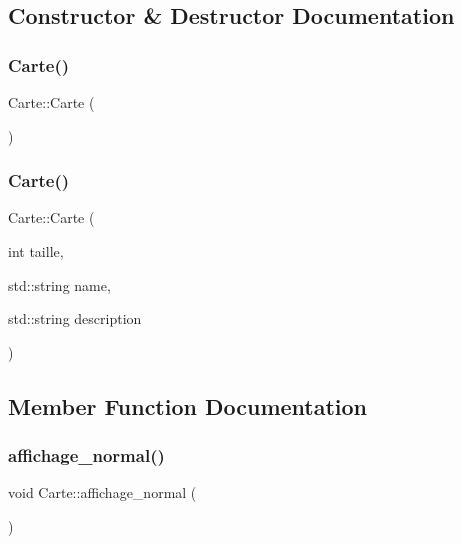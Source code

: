 \subsection{Constructor \& Destructor Documentation}
\mbox{\label{class_carte_a06daaca86c31c80f8308f4a81d46dc9b}} 
\subsubsection{\texorpdfstring{Carte()}{Carte()}\hspace{0.1cm}{\footnotesize\ttfamily [1/2]}}
{\footnotesize\ttfamily Carte\+::\+Carte (\begin{DoxyParamCaption}{ }\end{DoxyParamCaption})}

\mbox{\label{class_carte_a23c6f00e5cc97f469b8f8de4e37f54a9}} 
\subsubsection{\texorpdfstring{Carte()}{Carte()}\hspace{0.1cm}{\footnotesize\ttfamily [2/2]}}
{\footnotesize\ttfamily Carte\+::\+Carte (\begin{DoxyParamCaption}\item[{int}]{taille,  }\item[{std\+::string}]{name,  }\item[{std\+::string}]{description }\end{DoxyParamCaption})}



\subsection{Member Function Documentation}
\mbox{\label{class_carte_aa02757760851d19e549990e222d11fb5}} 
\subsubsection{\texorpdfstring{affichage\+\_\+normal()}{affichage\_normal()}}
{\footnotesize\ttfamily void Carte\+::affichage\+\_\+normal (\begin{DoxyParamCaption}{ }\end{DoxyParamCaption})}

